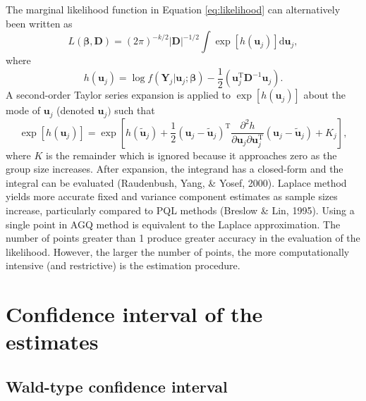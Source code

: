 \documentclass[12pt,oneside,a4paper]{reedthesis}
\begin{document}
The marginal likelihood function in Equation \eqref{eq:likelihood} can alternatively been written as
\begin{equation} 
L(\boldsymbol{\beta}, \mathbf{D})=(2 \pi)^{-k / 2}|\mathbf{D}|^{-1 / 2} \int \exp \left[h\left(\mathbf{u}_{j}\right)\right] \mathrm{d} \mathbf{u}_{j},
\end{equation}
where
\begin{equation} 
h\left(\mathbf{u}_{j}\right)=\log f\left(\mathbf{Y}_{j} | \mathbf{u}_{j} ; \boldsymbol{\beta}\right)-\frac{1}{2}\left(\mathbf{u}_{j}^{\mathrm{T}} \mathbf{D}^{-1} \mathbf{u}_{j}\right).
\end{equation}
A second-order Taylor series expansion is applied to \(\exp \left[h\left(\mathbf{u}_{j}\right)\right]\) about the mode of \(\mathbf{u}_{j}\) (denoted \(\mathbf{u}_{j} )\) such that
\begin{equation} 
\exp \left[h\left(\mathbf{u}_{j}\right)\right]=\exp \left[h\left(\widetilde{\mathbf{u}}_{j}\right)+\frac{1}{2}\left(\mathbf{u}_{j}-\widetilde{\mathbf{u}}_{j}\right)^{\mathrm{T}} \frac{\partial^{2} h}{\partial \mathbf{u}_{j} \partial \mathbf{u}_{j}^{\mathrm{T}}}\left(\mathbf{u}_{j}-\widetilde{\mathbf{u}}_{j}\right)+K_{j}\right],
\end{equation}
where \(K\) is the remainder which is ignored because it approaches zero as the group size increases. After expansion, the integrand has a closed-form and the integral can be evaluated (Raudenbush, Yang, \& Yosef, 2000).
Laplace method yields more accurate fixed and variance component estimates as sample sizes increase, particularly compared to PQL methods (Breslow \& Lin, 1995).
Using a single point in AGQ method is equivalent to the Laplace approximation. The number of points greater than 1 produce greater accuracy in the evaluation of the likelihood. However, the larger the number of points, the more computationally intensive (and restrictive) is the estimation procedure.

\hypertarget{confidence-interval-of-the-estimates}{%
\section{Confidence interval of the estimates}\label{confidence-interval-of-the-estimates}}

\hypertarget{wald-type-confidence-interval}{%
\subsection{Wald-type confidence interval}\label{wald-type-confidence-interval}}
\end{document}
